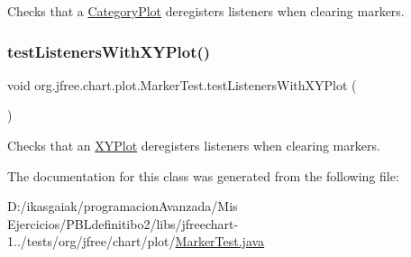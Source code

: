 Checks that a \mbox{\hyperlink{classorg_1_1jfree_1_1chart_1_1plot_1_1_category_plot}{Category\+Plot}} deregisters listeners when clearing markers. \mbox{\label{classorg_1_1jfree_1_1chart_1_1plot_1_1_marker_test_a5239bed5b870c5c56ce33777224d9320}} 
\subsubsection{\texorpdfstring{test\+Listeners\+With\+X\+Y\+Plot()}{testListenersWithXYPlot()}}
{\footnotesize\ttfamily void org.\+jfree.\+chart.\+plot.\+Marker\+Test.\+test\+Listeners\+With\+X\+Y\+Plot (\begin{DoxyParamCaption}{ }\end{DoxyParamCaption})}

Checks that an \mbox{\hyperlink{classorg_1_1jfree_1_1chart_1_1plot_1_1_x_y_plot}{X\+Y\+Plot}} deregisters listeners when clearing markers. 

The documentation for this class was generated from the following file\+:\begin{DoxyCompactItemize}
\item 
D\+:/ikasgaiak/programacion\+Avanzada/\+Mis Ejercicios/\+P\+B\+Ldefinitibo2/libs/jfreechart-\/1../tests/org/jfree/chart/plot/\mbox{\hyperlink{_marker_test_8java}{Marker\+Test.\+java}}\end{DoxyCompactItemize}
